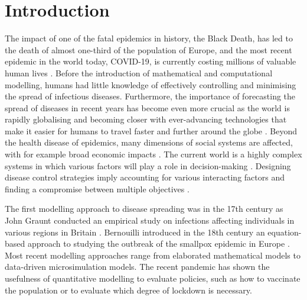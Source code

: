 \documentclass[smallextended]{svjour3}       %
\begin{document}



\section{Introduction}

The impact of one of the fatal epidemics in history, the Black Death, has led to the death of almost one-third of the population of Europe, and the most recent epidemic in the world today, COVID-19, is currently costing millions of valuable human lives \cite{glatter2021history}. Before the introduction of mathematical and computational modelling, humans had little knowledge of effectively controlling and minimising the spread of infectious diseases. Furthermore, the importance of forecasting the spread of diseases in recent years has become even more crucial as the world is rapidly globalising and becoming closer with ever-advancing technologies that make it easier for humans to travel faster and further around the globe \cite{saker2004globalization}. Beyond the health disease of epidemics, many dimensions of social systems are affected, with for example broad economic impacts \cite{boucekkine2021economics}. The current world is a highly complex systems in which various factors will play a role in decision-making \cite{bickley2021does}. Designing disease control strategies imply accounting for various interacting factors and finding a compromise between multiple objectives \cite{kaszowska2022immunity}.

The first modelling approach to disease spreading was in the 17th century as John Graunt  conducted an empirical study on infections affecting individuals in various regions in Britain \cite{morabia2013epidemiology}. Bernouilli introduced in the 18th century an equation-based approach to studying the outbreak of the smallpox epidemic in Europe \cite{dietz2002daniel}. Most recent modelling approaches range from elaborated mathematical models to data-driven microsimulation models. The recent pandemic has shown the usefulness of quantitative modelling to evaluate policies, such as how to vaccinate the population \cite{bosetti2022epidemiology} or to evaluate which degree of lockdown is necessary.
\end{document}

